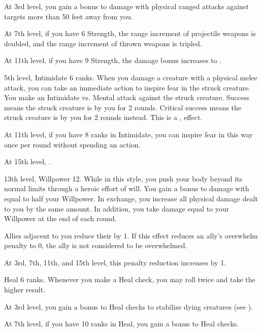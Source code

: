    At 3rd level, you gain a  bonus to damage with physical ranged attacks against targets more than 50 feet away from you.

    At 7th level, if you have 6 Strength, the range increment of projectile weapons is doubled, and the range increment of thrown weapons is tripled.

    At 11th level, if you have 9 Strength, the damage bonus increases to .

    \featpres 5th level, Intimidate 6 ranks.
    \featben When you damage a creature with a physical melee attack, you can take an immediate action to inspire fear in the struck creature.
    You make an Intimidate vs. Mental attack against the struck creature.
    Success means the struck creature is \shaken by you for 2 rounds.
    Critical success means the struck creature is \frightened by you for 2 rounds instead.
    This is a ,  effect.

    At 11th level, if you have 8 ranks in Intimidate, you can inspire fear in this way once per round without spending an action.

    At 15th level, \tdash.

    \featpre 13th level, Willpower 12.
    \featben While in this style, you push your body beyond its normal limits through a heroic effort of will.
    You gain a bonus to damage with  equal to half your Willpower.
    In exchange, you increase all physical damage dealt to you by the same amount.
    In addition, you take damage equal to your Willpower at the end of each round.

    \featben Allies adjacent to you reduce their  by 1.
    If this effect reduces an ally's overwhelm penalty to 0, the ally is not considered to be overwhelmed.

    At 3rd, 7th, 11th, and 15th level, this penalty reduction increases by 1.

    \featpre Heal 6 ranks.
    \featben Whenever you make a Heal check, you may roll twice and take the higher result.

    At 3rd level, you gain a  bonus to Heal checks to stabilize dying creatures (see ).

    At 7th level, if you have 10 ranks in Heal, you gain a  bonus to Heal checks.

